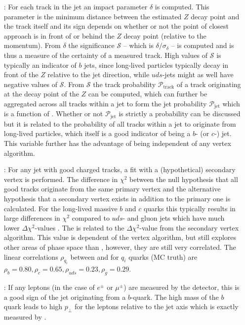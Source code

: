 \begin{enumerate}
  \item[\hspace{0.5cm} \code{projet}:] For each track in the jet an impact parameter $\delta$ is computed. This parameter is the minimum distance between the estimated $Z$ decay point and the track itself and its sign depends on whether or not the point of closest approach is in front of or behind the $Z$ decay point (relative to the momentum). From $\delta$ the significance $\mathcal{S}$ -- which is $\delta / \sigma_\delta$ -- is computed and is thus a measure of the certainty of a measured track. High values of $\mathcal{S}$ is typically an indicator of $b$ jets, since long-lived particles typically decay in front of the $Z$ relative to the jet direction, while $uds$-jets might as well have negative values of $\mathcal{S}$. From $\mathcal{S}$ the track probability $\mathcal{P}_\mathrm{track}$ of a track originating at the decay point of the $Z$ can be computed, which can further be aggregated across all tracks within a jet to form the jet probability $\mathcal{P}_\mathrm{jet}$ which  is a function of \autocite{buskulicPreciseMeasurementGZ1993}. 
  Whether or not $\mathcal{P}_\mathrm{jet}$ is strictly a probability can be discussed but it is related to the probability of all tracks within a jet to originate from long-lived particles, which itself is a good indicator of being a $b$- (or $c$-) jet. This variable further has the advantage of being independent of any vertex algorithm.

  \item[\hspace{0.5cm} \code{bqvjet}:] For any jet with good charged tracks, a fit with a (hypothetical) secondary vertex is performed. The difference in $\chi^2$ between the null hypothesis that all good tracks originate from the same primary vertex and the alternative hypothesis that a secondary vertex exists in addition to the primary one is calculated. For the long-lived massive $b$ and $c$ quarks this typically results in large differences in $\chi^2$ compared to $uds$- and gluon jets which have much lower $\Delta \chi^2$-values \citep{Armstrong1998hy}. The  is related to the $\Delta \chi^2$-value from the secondary vertex algorithm. This value is dependent of the vertex algorithm, but still explores other areas of phase space than , however, they are still very correlated. The linear correlations $\rho_{q_i}$ between  and  for $q_i$ quarks (MC truth) are $\rho_b = 0.80, \rho_c = 0.65, \rho_{uds} = 0.23, \rho_g = 0.29$.  

  \item[\hspace{0.5cm} \code{ptlrel}:] If any leptons (in the case of $e^\pm$ or $\mu^\pm$) are measured by the detector, this is a good sign of the jet originating from a $b$-quark. The high mass of the $b$ quark leads to high $p_\perp$ for the leptons relative to the jet axis which is exactly measured by .
\end{enumerate}

